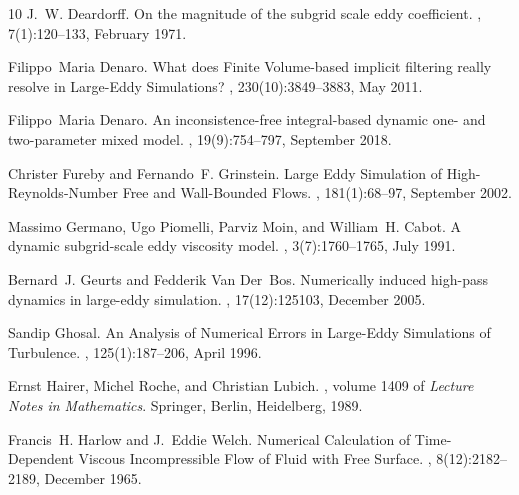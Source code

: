 \documentclass[preprint,twocolumn,5p]{elsarticle}
\begin{document}
\begin{thebibliography}{10}
J.~W. Deardorff.
\newblock On the magnitude of the subgrid scale eddy coefficient.
, 7(1):120--133, February 1971.

Filippo~Maria Denaro.
\newblock What does {{Finite Volume-based}} implicit filtering really resolve in {{Large-Eddy Simulations}}?
, 230(10):3849--3883, May 2011.

Filippo~Maria Denaro.
\newblock An inconsistence-free integral-based dynamic one- and two-parameter mixed model.
, 19(9):754--797, September 2018.

Christer Fureby and Fernando~F. Grinstein.
\newblock Large {{Eddy Simulation}} of {{High-Reynolds-Number Free}} and {{Wall-Bounded Flows}}.
, 181(1):68--97, September 2002.

Massimo Germano, Ugo Piomelli, Parviz Moin, and William~H. Cabot.
\newblock A dynamic subgrid-scale eddy viscosity model.
, 3(7):1760--1765, July 1991.

Bernard~J. Geurts and Fedderik Van Der~Bos.
\newblock Numerically induced high-pass dynamics in large-eddy simulation.
, 17(12):125103, December 2005.

Sandip Ghosal.
\newblock An {{Analysis}} of {{Numerical Errors}} in {{Large-Eddy Simulations}} of {{Turbulence}}.
, 125(1):187--206, April 1996.

Ernst Hairer, Michel Roche, and Christian Lubich.
, volume 1409 of {\em Lecture {{Notes}} in {{Mathematics}}}.
\newblock Springer, Berlin, Heidelberg, 1989.

Francis~H. Harlow and J.~Eddie Welch.
\newblock Numerical {{Calculation}} of {{Time-Dependent Viscous Incompressible Flow}} of {{Fluid}} with {{Free Surface}}.
, 8(12):2182--2189, December 1965.


\end{thebibliography}
\end{document}
